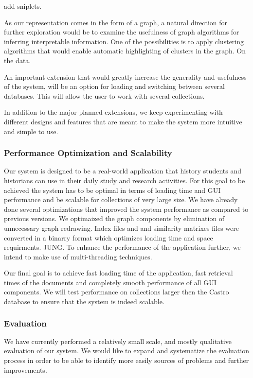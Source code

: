 add sniplets.

As our representation comes in the form of a graph, a natural direction for further exploration would be to examine the usefulness of 
graph algorithms for inferring interpretable information. One of the possibilities is to apply clustering algorithms 
that would enable automatic highlighting of clusters in the graph. On the data.

An important extension that would greatly increase the generality and usefulness of the system, 
will be an option for loading and switching between several databases. This will allow the user to work with several collections.

In addition to the major planned extensions, we keep experimenting with different designs and features that are meant to make the
system more intuitive and simple to use. 

\subsubsection{Performance Optimization and Scalability}
Our system is designed to be a real-world application that history students and historians can use in their daily study and research activities.
For this goal to be achieved the system has to be optimal in terms of loading time and GUI performance and be scalable for collections 
of very large size. We have already done several optimizations that improved the system performance as compared to
previous versions. We optimaized the graph components by elimination of unnecessary graph redrawing. Index files and and similarity matrixes
files were converted in a binarry format which optimizes loading time and space requirments. JUNG.
To enhance the performance of the application further, we intend to make use of multi-threading techniques. 

Our final goal is to achieve fast loading time of the application, fast retrieval times of the documents and completely 
smooth performance of all GUI components. We will test performance on collections larger then the Castro database to ensure
that the system is indeed scalable.    

\subsubsection{Evaluation}

We have currently performed a relatively small scale, and mostly qualitative evaluation of our system. We would like to 
expand and systematize the evaluation process in order to be able to identify more easily sources of problems and further improvements.


